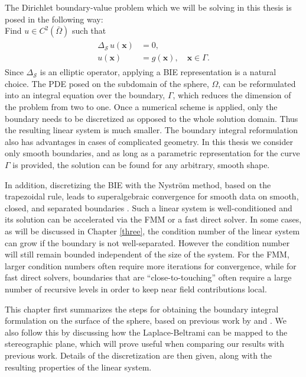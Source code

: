 \documentclass{sfuthesis}
\begin{document}
The Dirichlet boundary-value problem which we will be solving in this thesis is posed in the following way: \\
Find $u \in C^2(\bar{\Omega})$ such that 
\begin{align}
	\begin{split}
		{\Delta}_{\mathcal{S}\ }u(\mathbf{x})&=0,\\ 
		u(\mathbf{x})&=g(\mathbf{x}), \quad \mathbf{x} \in \Gamma. \label{eq: DirLapBelt}  
	\end{split}
\end{align}
Since $\Delta_{\mathcal{S}}$ is an elliptic operator, applying a BIE representation is a natural choice. The PDE posed on the subdomain of the sphere, $\Omega$, can be reformulated into an integral equation over the boundary, $\Gamma$, which reduces the dimension of the problem from two to one. Once a numerical scheme is applied, only the boundary needs to be discretized as opposed to the whole solution domain. Thus the resulting linear system is much smaller. 
The boundary integral reformulation also has advantages in cases of complicated geometry. In this thesis we consider only smooth boundaries, and as long as a parametric representation for the curve $\Gamma$ is provided, the solution can be found for any arbitrary, smooth shape. 

In addition, discretizing the BIE with the Nystr\"{o}m method, based on the trapezoidal rule, leads to superalgebraic convergence for smooth data on smooth, closed, and separated boundaries \cite{Atk97, Kress99}. Such a linear system is well-conditioned and its solution can be accelerated via the FMM or a fast direct solver. In some cases, as will be discussed in Chapter \ref{three}, the condition number of the linear system can grow if the boundary is not well-separated. However the condition number will still remain bounded independent of the size of the system. For the FMM, larger condition numbers often require more iterations for convergence, while for fast direct solvers, boundaries that are \enquote{close-to-touching} often require a large number of recursive levels in order to keep near field contributions local. 

This chapter first summarizes the steps for obtaining the boundary integral formulation on the surface of the sphere, based on previous work by \cite{GemmNigStein2008} and \cite{KropNig2014}. We also follow this by discussing how the Laplace-Beltrami can be mapped to the stereographic plane, which will prove useful when comparing our results with previous work. Details of the discretization are then given, along with the resulting properties of the linear system. 
\end{document}
